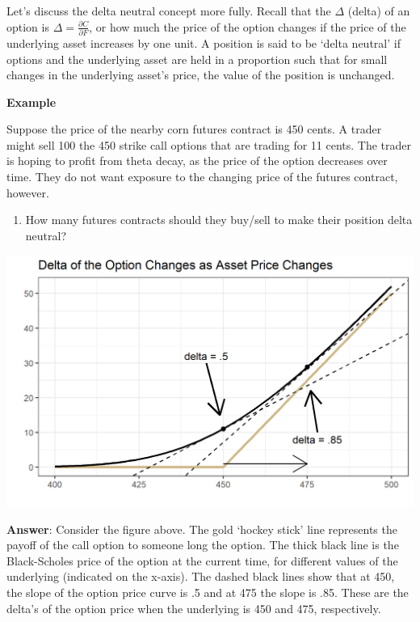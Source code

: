 \documentclass[
]{book}
\providecommand{\tightlist}{%
  \setlength{\itemsep}{0pt}\setlength{\parskip}{0pt}}
\begin{document}
Let's discuss the delta neutral concept more fully. Recall that the \(\Delta\) (delta) of an option is \(\Delta = \frac{\partial C}{\partial F}\), or how much the price of the option changes if the price of the underlying asset increases by one unit. A position is said to be `delta neutral' if options and the underlying asset are held in a proportion such that for small changes in the underlying asset's price, the value of the position is unchanged.

\textbf{Example}

Suppose the price of the nearby corn futures contract is 450 cents. A trader might sell 100 the 450 strike call options that are trading for 11 cents. The trader is hoping to profit from theta decay, as the price of the option decreases over time. They do not want exposure to the changing price of the futures contract, however.

\begin{enumerate}
\def\labelenumi{\arabic{enumi}.}
\tightlist
\item
  How many futures contracts should they buy/sell to make their position delta neutral?
\end{enumerate}

\includegraphics{assets/Options2-deltahedge.png}

\textbf{Answer}: Consider the figure above. The gold `hockey stick' line represents the payoff of the call option to someone long the option. The thick black line is the Black-Scholes price of the option at the current time, for different values of the underlying (indicated on the x-axis). The dashed black lines show that at 450, the slope of the option price curve is .5 and at 475 the slope is .85. These are the delta's of the option price when the underlying is 450 and 475, respectively.
\end{document}
